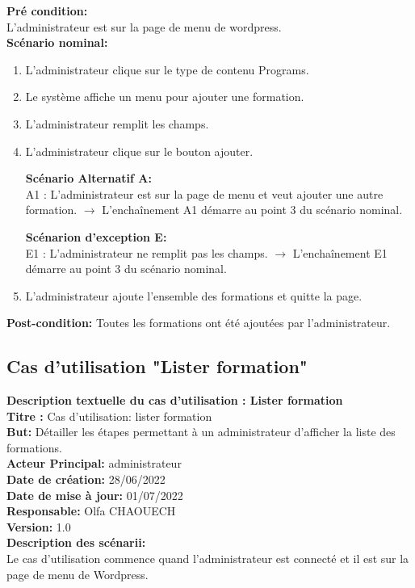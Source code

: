 \textbf{Pré condition:}\\
L'administrateur est sur la page de menu de wordpress.\\
\textbf{Scénario nominal:}
\begin{enumerate}
	\item L'administrateur clique sur le type de contenu Programs.
	\item Le système affiche un menu pour ajouter une formation. 
	\item L'administrateur remplit les champs.
	\item L'administrateur clique sur le bouton ajouter.
	
	\textbf{Scénario Alternatif A:}\\
	A1 : L'administrateur est sur la page de menu et veut ajouter une autre formation.
	$\rightarrow$ L'enchaînement A1 démarre au point 3 du scénario nominal.
	
	
	\textbf{Scénarion d'exception E:}\\
	E1 : L'administrateur ne remplit pas les champs.
	$\rightarrow$ L'enchaînement E1 démarre au point 3 du scénario nominal.
	
	\item L'administrateur ajoute l'ensemble des formations et quitte la page.
\end{enumerate}
\textbf{Post-condition:}
Toutes les formations ont été ajoutées par l'administrateur.
\subsection{Cas d'utilisation "Lister formation"}
\textbf{Description textuelle du cas d'utilisation : Lister formation}\\
\textbf{Titre :} Cas d'utilisation: lister formation\\
\textbf{But:} Détailler les étapes permettant à un administrateur d'afficher la liste des formations.\\
\textbf{Acteur Principal:} administrateur\\
\textbf{Date de création:} 28/06/2022\\
\textbf{Date de mise à jour:} 01/07/2022\\
\textbf{Responsable:} Olfa CHAOUECH\\
\textbf{Version:} 1.0\\
\textbf{Description des scénarii:}\\
Le cas d'utilisation commence quand l'administrateur est connecté et il est sur la page de menu de Wordpress.

